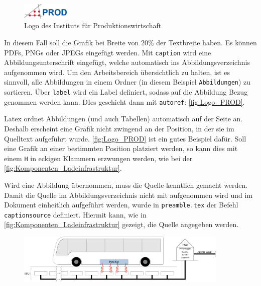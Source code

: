 \begin{figure}
    \centering
    \includegraphics[width=0.2\textwidth]{Abbildungen/Logo_PROD.png}
    \caption{Logo des Instituts für Produktionswirtschaft}
    \label{fig:Logo_PROD}
\end{figure}


In diesem Fall soll die Grafik bei Breite von 20\% der Textbreite haben. Es können PDFs, PNGs oder JPEGs eingefügt werden. Mit \texttt{caption} wird eine Abbildungsunterschrift eingefügt, welche automatisch ins Abbildungsverzeichnis aufgenommen wird. Um den Arbeitsbereich übersichtlich zu halten, ist es sinnvoll, alle Abbildungen in einem Ordner (in diesem Beispiel \texttt{Abbildungen}) zu sortieren. Über \texttt{label} wird ein Label definiert, sodass auf die Abbildung Bezug genommen werden kann. DIes geschieht dann mit \texttt{autoref}: \autoref{fig:Logo_PROD}.

Latex ordnet Abbildungen (und auch Tabellen) automatisch auf der Seite an. Deshalb erscheint eine Grafik nicht zwingend an der Position, in der sie im Quelltext aufgeführt wurde. \autoref{fig:Logo_PROD} ist ein gutes Beispiel dafür. Soll eine Grafik an einer bestimmten Position platziert werden, so kann dies mit einem \texttt{H} in eckigen Klammern erzwungen werden, wie bei der \autoref{fig:Komponenten_Ladeinfrastruktur}. 

Wird eine Abbildung übernommen, muss die Quelle kenntlich gemacht werden. Damit die Quelle im Abbildungsverzeichnis nicht mit aufgenommen wird und im Dokument einheitlich aufgeführt werden, wurde in \texttt{preamble.tex} der Befehl \texttt{captionsource} definiert. Hiermit kann, wie in \autoref{fig:Komponenten_Ladeinfrastruktur} gezeigt, die Quelle angegeben werden.

\begin{figure}[H]
    \centering
    \includegraphics[width=0.9\textwidth]{Abbildungen/Komponenten_dynamisch-induktive_Ladeinfrastruktur.pdf}
    \label{fig:Komponenten_Ladeinfrastruktur}
\end{figure}

